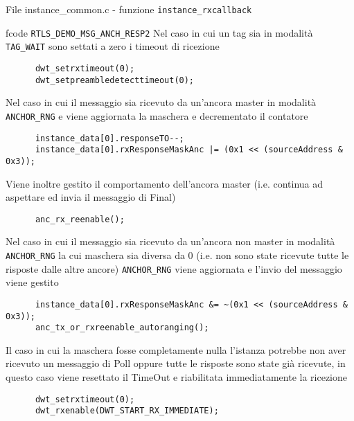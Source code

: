\begin{frame}[fragile, shrink=50]{File instance\_common.c - funzione \lstinline!instance_rxcallback!}
  \begin{block}{fcode \lstinline!RTLS_DEMO_MSG_ANCH_RESP2!}
    Nel caso in cui un tag sia in modalità \lstinline!TAG_WAIT! sono settati a zero i timeout di ricezione
    \begin{lstlisting}
      dwt_setrxtimeout(0);
      dwt_setpreambledetecttimeout(0);
    \end{lstlisting}
    Nel caso in cui il messaggio sia ricevuto da un'ancora \alert{master} in modalità \lstinline!ANCHOR_RNG! e viene aggiornata la maschera
    e decrementato il contatore
    \begin{lstlisting}
      instance_data[0].responseTO--;
      instance_data[0].rxResponseMaskAnc |= (0x1 << (sourceAddress & 0x3));
    \end{lstlisting}
    Viene inoltre gestito il comportamento dell'ancora \alert{master} (i.e. continua ad aspettare ed invia il messaggio di Final)
    \begin{lstlisting}
      anc_rx_reenable();
    \end{lstlisting}
    Nel caso in cui il messaggio sia ricevuto da un'ancora \alert{non} master in modalità \lstinline!ANCHOR_RNG! la cui maschera sia
    diversa da $0$ (i.e. non sono state ricevute tutte le risposte dalle altre ancore) \lstinline!ANCHOR_RNG! viene aggiornata e l'invio del
    messaggio viene gestito
    \begin{lstlisting}
      instance_data[0].rxResponseMaskAnc &= ~(0x1 << (sourceAddress & 0x3));
      anc_tx_or_rxreenable_autoranging();
    \end{lstlisting}
    Il caso in cui la maschera fosse completamente nulla l'istanza potrebbe non aver ricevuto un messaggio di Poll oppure tutte le risposte sono state già
    ricevute, in questo caso viene resettato il TimeOut e riabilitata immediatamente la ricezione
    \begin{lstlisting}
      dwt_setrxtimeout(0);
      dwt_rxenable(DWT_START_RX_IMMEDIATE);
    \end{lstlisting}
  \end{block}
\end{frame}

